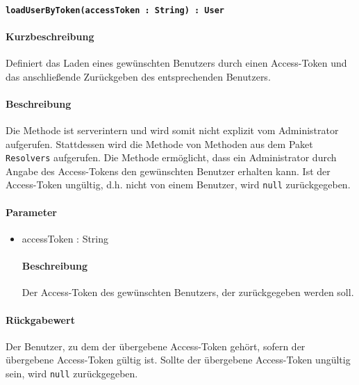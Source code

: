 \paragraph{\texttt{loadUserByToken(accessToken : String) : User}}%
\paragraph*{Kurzbeschreibung}
Definiert das Laden eines gewünschten Benutzers durch einen Access-Token und das anschließende Zurückgeben des entsprechenden Benutzers.
\paragraph*{Beschreibung}
Die Methode ist serverintern und wird somit nicht explizit vom Administrator aufgerufen.
Stattdessen wird die Methode von Methoden aus dem Paket \texttt{Resolvers} aufgerufen.
Die Methode ermöglicht, dass ein Administrator durch Angabe des Access-Tokens den gewünschten Benutzer erhalten kann. 
Ist der Access-Token ungültig, d.h. nicht von einem Benutzer, wird \texttt{null} zurückgegeben.
\paragraph*{Parameter}
\begin{itemize}
    \item accessToken : String
    		\paragraph*{Beschreibung}
    		Der Access-Token des gewünschten Benutzers, der zurückgegeben werden soll.
\end{itemize}
\paragraph*{Rückgabewert}
Der Benutzer, zu dem der übergebene Access-Token gehört, sofern der übergebene Access-Token gültig ist.
Sollte der übergebene Access-Token ungültig sein, wird \texttt{null} zurückgegeben.
